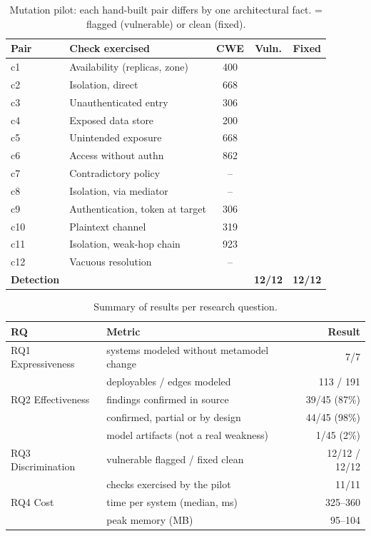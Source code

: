 \documentclass[conference]{IEEEtran}
\newcommand{\cmark}{\ding{51}}\newcommand{\xmark}{\ding{55}}
\begin{document}
\begin{table}[t]
\centering\caption{Mutation pilot: each hand-built pair differs by one architectural fact. \cmark = flagged (vulnerable) or clean (fixed).}
\label{tab:pilot}\footnotesize\setlength{\tabcolsep}{4pt}
\begin{tabular}{@{}llccc@{}}
\toprule
Pair & Check exercised & CWE & Vuln. & Fixed\\
\midrule
c1 & Availability (replicas, zone) & 400 & \cmark & \cmark\\
c2 & Isolation, direct & 668 & \cmark & \cmark\\
c3 & Unauthenticated entry & 306 & \cmark & \cmark\\
c4 & Exposed data store & 200 & \cmark & \cmark\\
c5 & Unintended exposure & 668 & \cmark & \cmark\\
c6 & Access without authn & 862 & \cmark & \cmark\\
c7 & Contradictory policy & -- & \cmark & \cmark\\
c8 & Isolation, via mediator & -- & \cmark & \cmark\\
c9 & Authentication, token at target & 306 & \cmark & \cmark\\
c10 & Plaintext channel & 319 & \cmark & \cmark\\
c11 & Isolation, weak-hop chain & 923 & \cmark & \cmark\\
c12 & Vacuous resolution & -- & \cmark & \cmark\\
\midrule
\textbf{Detection} & & & \textbf{12/12} & \textbf{12/12}\\
\bottomrule\end{tabular}\end{table}
\begin{table}[t]
\centering\caption{Summary of results per research question.}
\label{tab:rq}\footnotesize\setlength{\tabcolsep}{4pt}
\begin{tabular}{@{}lp{4.3cm}r@{}}
\toprule
RQ & Metric & Result\\
\midrule
RQ1 Expressiveness & systems modeled without metamodel change & 7/7\\
 & deployables / edges modeled & 113 / 191\\
\midrule
RQ2 Effectiveness & findings confirmed in source & 39/45 (87\%)\\
 & confirmed, partial or by design & 44/45 (98\%)\\
 & model artifacts (not a real weakness) & 1/45 (2\%)\\
RQ3 Discrimination & vulnerable flagged / fixed clean & 12/12 / 12/12\\
 & checks exercised by the pilot & 11/11\\
RQ4 Cost & time per system (median, ms) & 325--360\\
 & peak memory (MB) & 95--104\\
\bottomrule\end{tabular}\end{table}
\end{document}
